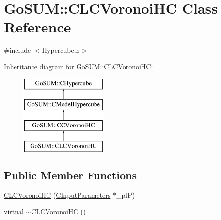 \hypertarget{class_go_s_u_m_1_1_c_l_c_voronoi_h_c}{\section{Go\-S\-U\-M\-:\-:C\-L\-C\-Voronoi\-H\-C Class Reference}
\label{class_go_s_u_m_1_1_c_l_c_voronoi_h_c}
}


{\ttfamily \#include $<$Hypercube.\-h$>$}

Inheritance diagram for Go\-S\-U\-M\-:\-:C\-L\-C\-Voronoi\-H\-C\-:\begin{figure}[H]
\begin{center}
\leavevmode
\includegraphics[height=4.000000cm]{class_go_s_u_m_1_1_c_l_c_voronoi_h_c}
\end{center}
\end{figure}
\subsection*{Public Member Functions}
\begin{DoxyCompactItemize}
\item 
\hyperlink{class_go_s_u_m_1_1_c_l_c_voronoi_h_c_a243f56a29444b86e89bd3463582bff46}{C\-L\-C\-Voronoi\-H\-C} (\hyperlink{class_go_s_u_m_1_1_c_input_parameters}{C\-Input\-Parameters} $\ast$\-\_\-p\-I\-P)
\item 
virtual \hyperlink{class_go_s_u_m_1_1_c_l_c_voronoi_h_c_a112c70423f4b76f81f1084e4831ea856}{$\sim$\-C\-L\-C\-Voronoi\-H\-C} ()
\end{DoxyCompactItemize}
